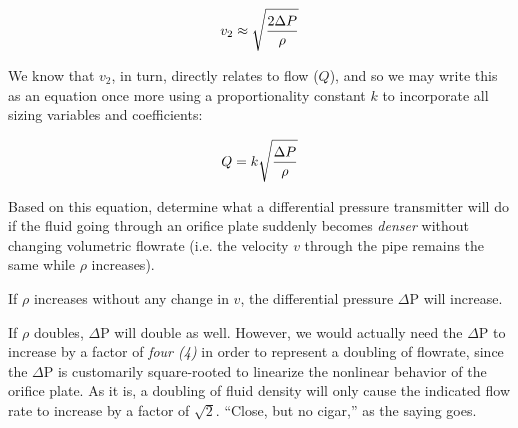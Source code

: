 $$v_2 \approx \sqrt{{2 \Delta P} \over \rho}$$

We know that $v_2$, in turn, directly relates to flow ($Q$), and so we may write this as an equation once more using a proportionality constant $k$ to incorporate all sizing variables and coefficients:

$$Q = k \sqrt{{\Delta P} \over \rho}$$

Based on this equation, determine what a differential pressure transmitter will do if the fluid going through an orifice plate suddenly becomes {\it denser} without changing volumetric flowrate (i.e. the velocity $v$ through the pipe remains the same while $\rho$ increases).







If $\rho$ increases without any change in $v$, the differential pressure $\Delta$P will increase.

\vskip 10pt

If $\rho$ doubles, $\Delta$P will double as well.  However, we would actually need the $\Delta$P to increase by a factor of {\it four (4)} in order to represent a doubling of flowrate, since the $\Delta$P is customarily square-rooted to linearize the nonlinear behavior of the orifice plate.  As it is, a doubling of fluid density will only cause the indicated flow rate to increase by a factor of $\sqrt{2}$.  ``Close, but no cigar,'' as the saying goes.











